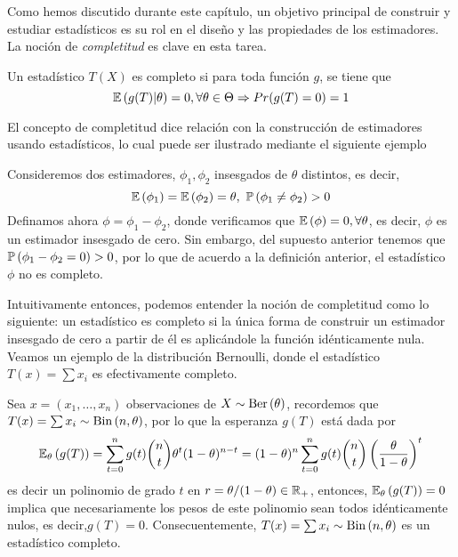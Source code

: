Como hemos discutido durante este capítulo, un objetivo principal de construir y estudiar estadísticos es su rol en el diseño y las propiedades de los estimadores. La noción de \textit{completitud} es clave en esta tarea. 

\begin{definition}
	Un estadístico $T(X)$ es completo si para toda función $g$, se tiene que 
	\begin{equation}
		\mathbb{E} \left(g(T)|\theta\right) = 0, \forall \theta\in\Theta \Rightarrow Pr(g(T)=0) = 1
	\end{equation}
	
\end{definition}
El concepto de completitud dice relación con la construcción de estimadores usando estadísticos, lo cual puede ser ilustrado mediante el siguiente ejemplo

\begin{example}
	Consideremos dos estimadores, $\phi_1, \phi_2$ insesgados de $\theta$ distintos, es decir, 
	\begin{equation}
	\mathbb{E} \left(\phi_1\right) = \mathbb{E} \left(\phi_2\right) = \theta, \ \mathbb{P} \left(\phi_1\neq \phi_2\right) > 0
	\end{equation}
	Definamos ahora $\phi = \phi_1 - \phi_2$, donde verificamos que $\mathbb{E} \left(\phi\right) = 0, \forall \theta$, es decir, $\phi$ es un estimador insesgado de cero. Sin embargo, del supuesto anterior tenemos que $\mathbb{P} \left(\phi_1 - \phi_2=0\right)>0$, por lo que de acuerdo a la definición anterior, el estadístico $\phi$ no es completo. 
\end{example}
Intuitivamente entonces, podemos entender la noción de completitud como lo siguiente: un estadístico es completo si la única forma de construir un estimador insesgado de cero a partir de él es aplicándole la función idénticamente nula.  Veamos un ejemplo de la distribución Bernoulli, donde el estadístico $T(x) = \sum x_i$ es efectivamente completo. 

\begin{example}
	\label{eq:est_completo_bernoulli}
	Sea $x=(x_1,\ldots,x_n)$ observaciones de $X\sim\text{Ber}\left(\theta\right)$, recordemos que $T(x) = \sum x_i\sim\text{Bin}\left(n,\theta\right)$, por lo que la esperanza $g(T)$ está dada por
	\begin{equation}
		\mathbb{E}_\theta \left(g(T)\right) = \sum_{t=0}^n g(t)\binom{n}{t}\theta^t(1-\theta)^{n-t}= (1-\theta)^n\sum_{t=0}^n g(t)\binom{n}{t}\left(\frac{\theta}{1-\theta}\right)^t
	\end{equation}
	es decir un polinomio de grado $t$ en $r=\theta/(1-\theta)\in{\mathbb R}_+$, entonces, $\mathbb{E}_\theta \left(g(T)\right) = 0$ implica que necesariamente los pesos de este polinomio sean todos idénticamente nulos, es decir,${g(T)} = 0$. Consecuentemente, $T(x) = \sum x_i\sim\text{Bin}\left(n,\theta\right)$ es un estadístico completo.
\end{example}

